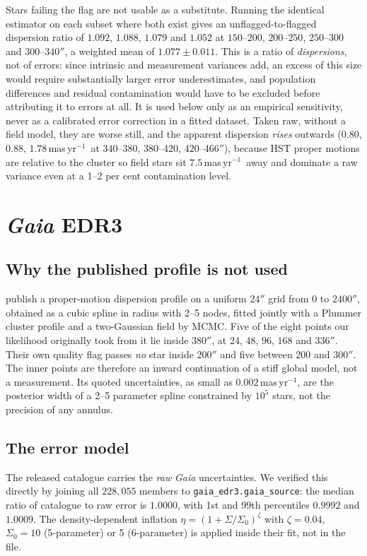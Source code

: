\documentclass[11pt,a4paper]{article}
\newcommand{\masyr}{mas\,yr$^{-1}$}
\begin{document}
Stars failing the flag are not usable as a substitute. Running the identical estimator on
each subset where both exist gives an unflagged-to-flagged dispersion ratio of $1.092$,
$1.088$, $1.079$ and $1.052$ at $150$--$200$, $200$--$250$, $250$--$300$ and $300$--$340''$,
a weighted mean of $1.077\pm0.011$. This is a ratio of \emph{dispersions}, not of errors:
since intrinsic and measurement variances add, an excess of this size would require
substantially larger error underestimates, and population differences and residual
contamination would have to be excluded before attributing it to errors at all. It is used
below only as an empirical sensitivity, never as a calibrated error correction in a fitted
dataset.
Taken raw, without a field model, they are worse still, and the apparent dispersion
\emph{rises} outwards ($0.80$, $0.88$, $1.78$\,\masyr\ at $340$--$380$, $380$--$420$,
$420$--$466''$), because HST proper motions are relative to the cluster so field stars sit
$7.5$\,\masyr\ away and dominate a raw variance even at a 1--2 per cent contamination level.

\section{\emph{Gaia} EDR3}

\subsection{Why the published profile is not used}

\citet{vasiliev2021} publish a proper-motion dispersion profile on a uniform $24''$ grid from
0 to $2400''$, obtained as a cubic spline in radius with 2--5 nodes, fitted jointly with a
Plummer cluster profile and a two-Gaussian field by MCMC. Five of the eight points our
likelihood originally took from it lie inside $380''$, at $24$, $48$, $96$, $168$ and
$336''$. Their own quality flag passes \emph{no} star inside $200''$ and five between 200 and
$300''$. The inner points are therefore an inward continuation of a stiff global model, not a
measurement. Its quoted uncertainties, as small as $0.002$\,\masyr, are the posterior width
of a 2--5 parameter spline constrained by $10^5$ stars, not the precision of any annulus.

\subsection{The error model}

The released catalogue carries the \emph{raw} \emph{Gaia} uncertainties. We verified this
directly by joining all $228{,}055$ members to \texttt{gaia\_edr3.gaia\_source}: the median
ratio of catalogue to raw error is $1.0000$, with 1st and 99th percentiles $0.9992$ and
$1.0009$. The density-dependent inflation $\eta=(1+\Sigma/\Sigma_0)^\zeta$ with
$\zeta=0.04$, $\Sigma_0=10$ (5-parameter) or 5 (6-parameter) is applied inside their fit, not
in the file.
\end{document}

